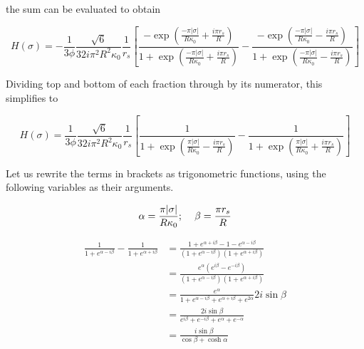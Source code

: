 \documentclass[onecolumn]{aastex63}
\begin{document}
\noindent the sum can be evaluated to obtain

\begin{equation}
    H(\sigma) = - \frac{1}{3 \phi} \frac{\sqrt{6}}{32 i \pi^2 R^2 \kappa_0} \frac{1}{r_s} \left[\frac{-\exp{\left(\frac{-\pi |\sigma|}{R\kappa_0} + \frac{i\pi r_s}{R}\right)}}{1 + \exp{\left(\frac{-\pi |\sigma|}{R\kappa_0} + \frac{i\pi r_s}{R}\right)}}-\frac{-\exp{\left(\frac{-\pi |\sigma|}{R\kappa_0} - \frac{i\pi r_s}{R}\right)}}{1 + \exp{\left(\frac{-\pi |\sigma|}{R\kappa_0} - \frac{i\pi r_s}{R}\right)}}\right]
\end{equation}

Dividing top and bottom of each fraction through by its numerator, this simplifies to

\begin{equation} \label{before_trig}
    H(\sigma) = \frac{1}{3 \phi} \frac{\sqrt{6}}{32 i \pi^2 R^2 \kappa_0} \frac{1}{r_s} \left[\frac{1}{1 + \exp{\left(\frac{\pi |\sigma|}{R\kappa_0} - \frac{i\pi r_s}{R}\right)}}-\frac{1}{1 + \exp{\left(\frac{\pi |\sigma|}{R\kappa_0} + \frac{i\pi r_s}{R}\right)}}\right]
\end{equation}

\noindent Let us rewrite the terms in brackets as trigonometric functions, using the following variables as their arguments.

\begin{equation}
    \alpha = \frac{\pi |\sigma|}{R\kappa_0}; \hspace{0.4cm} \beta = \frac{\pi r_s}{R}
\end{equation}

\begin{equation}
    \begin{split}
    \frac{1}{1+e^{\alpha - i\beta}} - \frac{1}{1+e^{\alpha + i\beta}} &= \frac{1+e^{\alpha + i\beta} - 1 - e^{\alpha - i\beta}}{\left(1+e^{\alpha - i\beta}\right)\left(1+e^{\alpha + i\beta}\right)} \\
    &= \frac{e^{\alpha}\left(e^{i\beta} - e^{- i\beta}\right)}{\left(1+e^{\alpha - i\beta}\right)\left(1+e^{\alpha + i\beta}\right)} \\
    &= \frac{e^{\alpha}}{1 + e^{\alpha - i\beta} + e^{\alpha + i\beta} + e^{2\alpha}} 2i \sin{\beta} \\
    &= \frac{2i \sin{\beta}}{e^{i\beta} + e^{- i\beta} + e^{\alpha} + e^{-\alpha}} \\
    &= \frac{i \sin{\beta}}{\cos{\beta} + \cosh{\alpha}}
    \end{split}
\end{equation}
\end{document}
